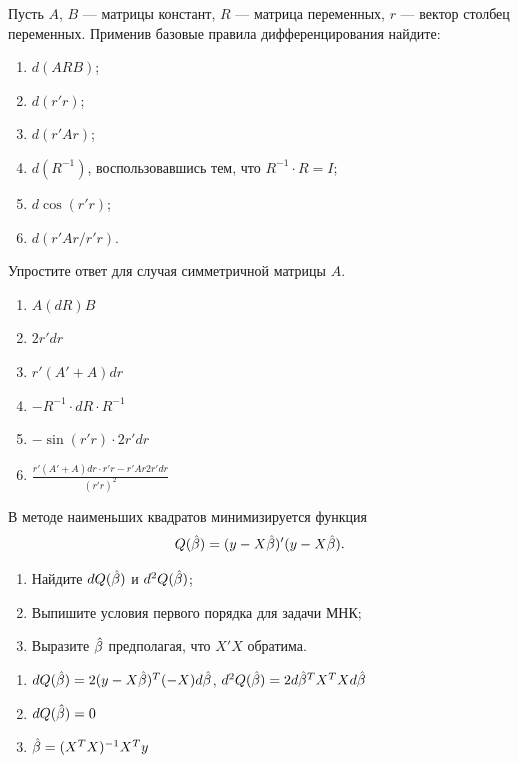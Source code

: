 \begin{problem}
Пусть $A$, $B$ — матрицы констант, $R$ — матрица переменных, $r$ — вектор столбец переменных. 
Применив базовые правила дифференцирования найдите:

\begin{enumerate}
\item $d(ARB)$;
\item $d(r'r)$;
\item $d(r'Ar)$;
\item $d(R^{-1})$, воспользовавшись тем, что $R^{-1} \cdot R = I$;
\item $d \cos(r'r)$;
\item $d(r'Ar/r'r)$.
\end{enumerate}

Упростите ответ для случая симметричной матрицы $A$.

\begin{sol}
\begin{enumerate}
\item $A(dR)B$
\item $2r'dr$
\item $r'(A'+A)dr$
\item $-R^{-1}\cdot dR \cdot R^{-1}$
\item $-\sin(r'r)\cdot 2r'dr$
\item $\frac{r'(A'+A)dr \cdot r'r - r'Ar2r'dr}{(r'r)^2}$
\end{enumerate}
\end{sol}
\end{problem}


\begin{problem}
В методе наименьших квадратов минимизируется функция
\[
Q(\hat{\beta}) = (y - X\hat{\beta})'(y - X\hat{\beta}).
\]

\begin{enumerate}
\item Найдите $dQ(\hat{\beta})$ и $d^2Q(\hat{\beta})$;
\item Выпишите условия первого порядка для задачи МНК;
\item Выразите $\hat{\beta}$ предполагая, что $X'X$ обратима.
\end{enumerate}


\begin{sol}
\begin{enumerate}
\item $dQ(\hat{\beta}) = 2(y-X\hat{\beta})^T (-X) d\hat{\beta}$, $d^2Q(\hat{\beta}) = 2d\hat{\beta}^T X^T X d\hat{\beta}$
\item $dQ(\hat{\beta}) = 0$
\item $\hat{\beta} = (X^T X)^{-1} X^T y$
\end{enumerate}
\end{sol}
\end{problem}

